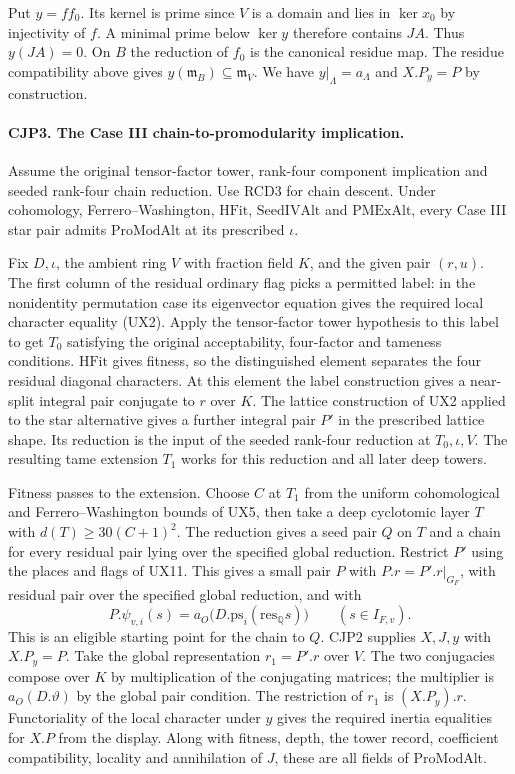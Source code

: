 Put $y=ff_0$. Its kernel is prime since $V$ is a domain and lies in
$\ker x_0$ by injectivity of $f$. A minimal prime below $\ker y$
therefore contains $JA$. Thus $y(JA)=0$. On $B$ the reduction of
$f_0$ is the canonical residue map. The residue compatibility above
gives $y(\mathfrak m_B)\subseteq\mathfrak m_V$. We have
$y|_\Lambda=a_\Lambda$ and $X.P_y=P$ by construction.

\paragraph{CJP3. The Case III chain-to-promodularity implication.}
Assume the original tensor-factor tower, rank-four component implication
and seeded rank-four chain reduction. Use RCD3 for chain descent. Under
cohomology, Ferrero--Washington, $\mathrm{HFit}$, $\mathrm{SeedIVAlt}$
and $\mathrm{PMExAlt}$, every Case III star pair admits
$\mathrm{ProModAlt}$ at its prescribed $\iota$.

Fix $D,\iota$, the ambient ring $V$ with fraction field $K$, and the
given pair $(r,u)$. The first column of the residual ordinary flag picks
a permitted label: in the nonidentity permutation case its eigenvector
equation gives the required local character equality (UX2). Apply the
tensor-factor tower hypothesis to this label to get $T_0$ satisfying
the original acceptability, four-factor and tameness conditions.
$\mathrm{HFit}$ gives fitness, so the distinguished element separates
the four residual diagonal characters. At this element the label
construction gives a near-split integral pair conjugate to $r$ over
$K$. The lattice construction of UX2 applied to the star alternative
gives a further integral pair $P'$ in the prescribed lattice shape.
Its reduction is the input of the seeded rank-four reduction at
$T_0,\iota,V$. The resulting tame extension $T_1$ works for this
reduction and all later deep towers.

Fitness passes to the extension. Choose $C$ at $T_1$ from the uniform
cohomological and Ferrero--Washington bounds of UX5, then take a deep
cyclotomic layer $T$ with $d(T)\ge30(C+1)^2$. The reduction gives a
seed pair $Q$ on $T$ and a chain for every residual pair lying over
the specified global reduction. Restrict $P'$ using the places and
flags of UX11. This gives a small pair $P$ with $P.r=P'.r|_{G_F}$,
with residual pair over the specified global reduction, and with
\[
 P.\psi_{v,i}(s)=a_O\bigl(D.\mathrm{ps}_i(\mathrm{res}_{\mathbb Q}s)\bigr)
       \qquad (s\in I_{F,v}).
\]
This is an eligible starting point for the chain to $Q$. CJP2 supplies
$X,J,y$ with $X.P_y=P$. Take the global representation $r_1=P'.r$ over
$V$. The two conjugacies compose over $K$ by multiplication of the
conjugating matrices; the multiplier is $a_O(D.\vartheta)$ by the
global pair condition. The restriction of $r_1$ is $(X.P_y).r$.
Functoriality of the local character under $y$ gives the required
inertia equalities for $X.P$ from the display. Along with fitness,
depth, the tower record, coefficient compatibility, locality and
annihilation of $J$, these are all fields of $\mathrm{ProModAlt}$.

